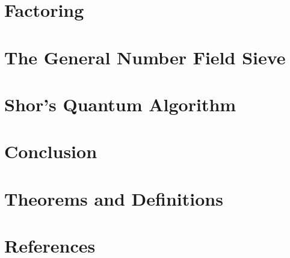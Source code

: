 \documentclass[10pt,a4paper]{article}
\theoremstyle{plain}
\theoremstyle{definition}
\begin{document}
  \tableofcontents
  \section{Factoring}
  \section{The General Number Field Sieve}
    
  \section{Shor's Quantum Algorithm}
  \section{Conclusion}
  \section{Theorems and Definitions}
    
  \section{References}
\end{document}
